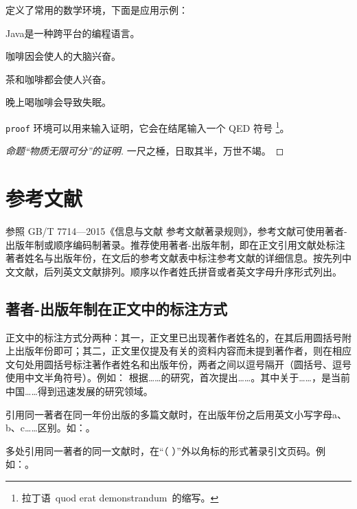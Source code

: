 \ucasthesis{} 定义了常用的数学环境，下面是应用示例：
\begin{definition}
Java是一种跨平台的编程语言。
\end{definition}

\begin{theorem}
咖啡因会使人的大脑兴奋。
\end{theorem}

\begin{lemma}
茶和咖啡都会使人兴奋。
\end{lemma}

\begin{corollary}
晚上喝咖啡会导致失眠。
\end{corollary}

\texttt{proof} 环境可以用来输入证明，它会在结尾输入一个 QED 符号
\footnote{拉丁语~quod erat demonstrandum~的缩写。}。

\begin{proof}[命题“物质无限可分”的证明]
一尺之棰，日取其半，万世不竭。
\end{proof}

\section{参考文献}
\label{sec:ref}

参照 GB/T 7714—2015《信息与文献 参考文献著录规则》，参考文献可使用著者-出版年制或顺序编码制著录。推荐使用著者-出版年制，即在正文引用文献处标注著者姓名与出版年份，在文后的参考文献表中标注参考文献的详细信息。按先列中文文献，后列英文文献排列。顺序以作者姓氏拼音或者英文字母升序形式列出。

\subsection{著者-出版年制在正文中的标注方式}

正文中的标注方式分两种：其一，正文里已出现著作者姓名的，在其后用圆括号附上出版年份即可；其二，正文里仅提及有关的资料内容而未提到著作者，则在相应文句处用圆括号标注著作者姓名和出版年份，两者之间以逗号隔开（圆括号、逗号使用中文半角符号）。例如：
\citet{nadkarni1992} 根据……的研究，首次提出……。其中关于……\citep{nadkarni1992}，是当前中国……得到迅速发展的研究领域\citep{zhu1973}。

引用同一著者在同一年份出版的多篇文献时，在出版年份之后用英文小写字母a、b、c……区别。如：\citet{chen2001a,chen2001b}。

多处引用同一著者的同一文献时，在“（ ）”外以角标的形式著录引文页码。例如：\citep[][343-351]{hua1973}。

